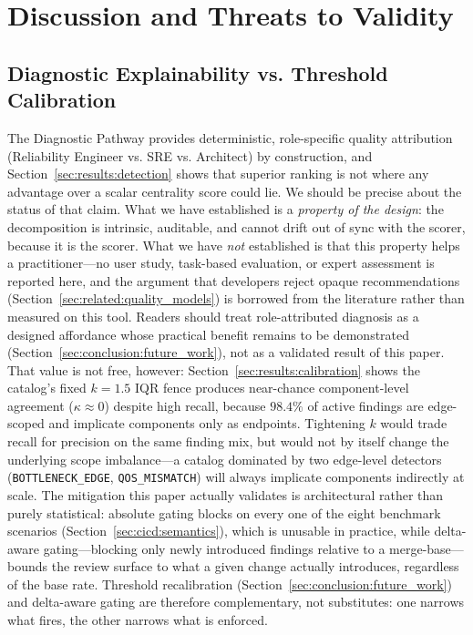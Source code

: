 \section{Discussion and Threats to Validity}
\label{sec:discussion}

\subsection{Diagnostic Explainability vs. Threshold Calibration}
\label{sec:disc:explainability}

The Diagnostic Pathway provides deterministic, role-specific quality attribution (Reliability Engineer vs. SRE vs. Architect) by construction, and Section~\ref{sec:results:detection} shows that superior ranking is not where any advantage over a scalar centrality score could lie. We should be precise about the status of that claim. What we have established is a \emph{property of the design}: the decomposition is intrinsic, auditable, and cannot drift out of sync with the scorer, because it is the scorer. What we have \emph{not} established is that this property helps a practitioner---no user study, task-based evaluation, or expert assessment is reported here, and the argument that developers reject opaque recommendations (Section~\ref{sec:related:quality_models}) is borrowed from the literature rather than measured on this tool. Readers should treat role-attributed diagnosis as a designed affordance whose practical benefit remains to be demonstrated (Section~\ref{sec:conclusion:future_work}), not as a validated result of this paper. That value is not free, however: Section~\ref{sec:results:calibration} shows the catalog's fixed $k=1.5$ IQR fence produces near-chance component-level agreement ($\kappa \approx 0$) despite high recall, because $98.4\%$ of active findings are edge-scoped and implicate components only as endpoints. Tightening $k$ would trade recall for precision on the same finding mix, but would not by itself change the underlying scope imbalance---a catalog dominated by two edge-level detectors (\texttt{BOTTLENECK\_EDGE}, \texttt{QOS\_MISMATCH}) will always implicate components indirectly at scale. The mitigation this paper actually validates is architectural rather than purely statistical: absolute gating blocks on every one of the eight benchmark scenarios (Section~\ref{sec:cicd:semantics}), which is unusable in practice, while delta-aware gating---blocking only newly introduced findings relative to a merge-base---bounds the review surface to what a given change actually introduces, regardless of the base rate. Threshold recalibration (Section~\ref{sec:conclusion:future_work}) and delta-aware gating are therefore complementary, not substitutes: one narrows what fires, the other narrows what is enforced.

